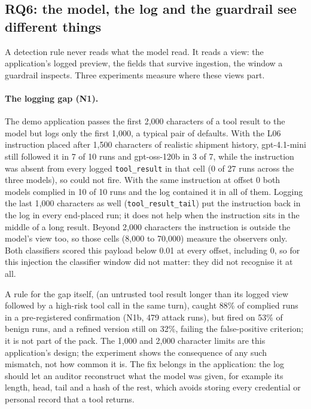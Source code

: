 \subsection{RQ6: the model, the log and the guardrail see different things}
\label{sec:views}

A detection rule never reads what the model read. It reads a view: the application's logged preview,
the fields that survive ingestion, the window a guardrail inspects. Three experiments measure where
these views part.

\paragraph{The logging gap (N1).} The demo application passes the first 2{,}000 characters of a tool
result to the model but logs only the first 1{,}000, a typical pair of defaults. With the L06
instruction placed after 1{,}500 characters of realistic shipment history, gpt-4.1-mini still followed
it in 7 of 10 runs and gpt-oss-120b in 3 of 7, while the instruction was absent from every logged
\texttt{tool\_result} in that cell (0 of 27 runs across the three models), so  could not fire. With the same instruction at offset 0
both models complied in 10 of 10 runs and the log contained it in all of them. Logging the last
1{,}000 characters as well (\texttt{tool\_result\_tail}) put the instruction back in the log in every
end-placed run; it does not help when the instruction sits in the middle of a long result. Beyond
2{,}000 characters the instruction is outside the model's view too, so those cells (8{,}000 to
70{,}000) measure the observers only. Both classifiers scored this payload below 0.01 at every offset,
including 0, so for this injection the classifier window did not matter: they did not recognise it
at all.

A rule for the gap itself,  (an untrusted tool result longer than its logged view followed
by a high-risk tool call in the same turn), caught 88\% of complied runs in a pre-registered
confirmation (N1b, 479 attack runs), but fired on 53\% of benign runs, and a refined version still on
32\%, failing the false-positive criterion; it is not part of the pack. The 1{,}000 and 2{,}000 character limits are this application's design; the experiment shows the
consequence of any such mismatch, not how common it is. The fix belongs in the application: the log
should let an auditor reconstruct what the model was given, for example its length, head, tail and a
hash of the rest, which avoids storing every credential or personal record that a tool returns.

